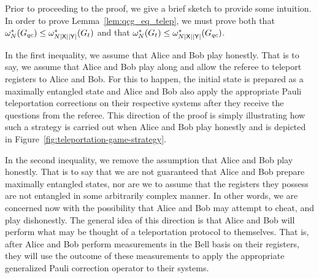 Prior to proceeding to the proof, we give a brief sketch to provide some intuition. In order to prove Lemma~\ref{lem:qcg_eq_telep}, we must prove both that $\omega_N^*(G_{qc}) \leq \omega_{N \left\lvert \mathsf{X} \right\rvert \left\lvert \mathsf{Y} \right\rvert}^*(G_t)$ and that $\omega_{N}^*(G_t) \leq \omega_{N\left\lvert \mathsf{X} \right\rvert\left\lvert \mathsf{Y} \right\rvert}^*(G_{qc})$. 

In the first inequality, we assume that Alice and Bob play honestly. That is to say, we assume that Alice and Bob play along and allow the referee to teleport registers to Alice and Bob. For this to happen, the initial state is prepared as a maximally entangled state and Alice and Bob also apply the appropriate Pauli teleportation corrections on their respective systems after they receive the questions from the referee. This direction of the proof is simply illustrating how such a strategy is carried out when Alice and Bob play honestly and is depicted in Figure~\ref{fig:teleportation-game-strategy}. 

In the second inequality, we remove the assumption that Alice and Bob play honestly. That is to say that we are not guaranteed that Alice and Bob prepare maximally entangled states, nor are we to assume that the registers they possess are not entangled in some arbitrarily complex manner. In other words, we are concerned now with the possibility that Alice and Bob may attempt to cheat, and play dishonestly. The general idea of this direction is that Alice and Bob will perform what may be thought of a teleportation protocol to themselves. That is, after Alice and Bob perform measurements in the Bell basis on their registers, they will use the outcome of these measurements to apply the appropriate generalized Pauli correction operator to their systems. 

